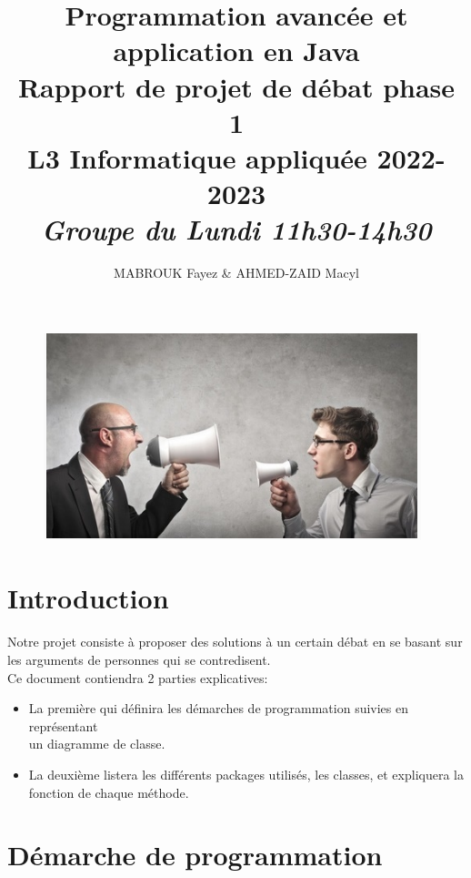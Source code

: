 \documentclass[12pt]{article}
\author{MABROUK Fayez \& AHMED-ZAID Macyl}
\date{}
\title{{\bf Programmation avancée et application en {\sf Java}} \\
	Rapport de projet de débat phase 1 \\
	{\small L3 Informatique appliquée 2022-2023} \\
			 
	{\it \small Groupe du Lundi 11h30-14h30}}
\begin{document}
	\maketitle
	\begin{figure}[!hbtp]
		\centering
		\includegraphics[scale=1.5]{debat.PNG}
	\end{figure}
	\newpage
	\section{Introduction}
	\paragraph {}
	Notre projet consiste à proposer des solutions à un certain débat en se basant sur les arguments de
	personnes qui se contredisent.\\
	Ce document contiendra 2 parties explicatives: 
	\begin{itemize}
		\item La première qui définira les démarches de programmation suivies en représentant\\ un
		diagramme de classe.
		\item  La deuxième listera les différents packages utilisés, les classes, et expliquera la fonction de
		chaque méthode.
	\end{itemize}
	\section{Démarche de programmation}
\end{document}
